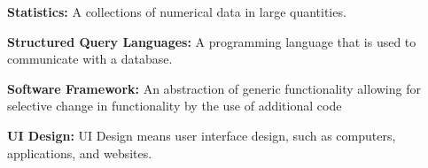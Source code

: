 \documentclass[letterpaper,10pt, draftclsnofoot,onecolumn]{IEEEtran}
\begin{document}
{{{\noindent\color{black}\textbf{Statistics:} A collections of numerical data in large quantities. }

\noindent\color{black}\textbf{Structured Query Languages:} A programming language that is used to communicate with a database.}

\noindent\color{black}\textbf{Software Framework:} An abstraction of generic functionality allowing for selective change in functionality by the use of additional code

\noindent\color{black}\textbf{UI Design:} UI Design means user interface design, such as computers, applications, and websites.

}
\end{document}
